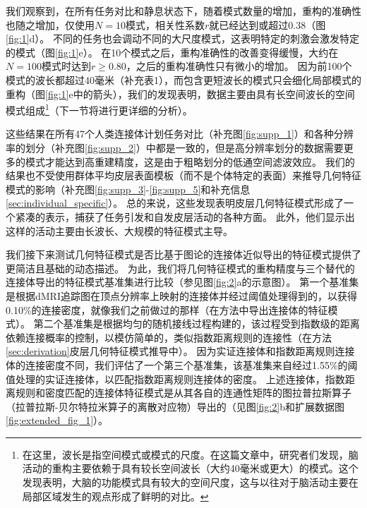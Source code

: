 \documentclass[lang=cn,a4paper,newtx]{elegantpaper}
\begin{document}
我们观察到，在所有任务对比和静息状态下，随着模式数量的增加，重构的准确性也随之增加，仅使用$ N=10 $模式，相关性系数$ r $就已经达到或超过0.38（图\ref{fig:1}d）。
不同的任务也会调动不同的大尺度模式，这表明特定的刺激会激发特定的模式（图\ref{fig:1}e）。
在10个模式之后，重构准确性的改善变得缓慢，大约在$ N=100 $模式时达到$ r \geq 0.80 $，之后的重构准确性只有微小的增加。
因为前100个模式的波长都超过40毫米（补充表1），而包含更短波长的模式只会细化局部模式的重构（图\ref{fig:1}e中的箭头），我们的发现表明，数据主要由具有长空间波长的空间模式组成\footnote{在这里，波长是指空间模式或模式的尺度。在这篇文章中，研究者们发现，脑活动的重构主要依赖于具有较长空间波长（大约40毫米或更大）的模式。这个发现表明，大脑的功能模式具有较大的空间尺度，这与以往对于脑活动主要在局部区域发生的观点形成了鲜明的对比。}（下一节将进行更详细的分析）。


这些结果在所有47个人类连接体计划任务对比（补充图\ref{fig:supp_1}）和各种分辨率的划分（补充图\ref{fig:supp_2}）中都是一致的，但是高分辨率划分的数据需要更多的模式才能达到高重建精度，这是由于粗略划分的低通空间滤波效应。
我们的结果也不受使用群体平均皮层表面模板（而不是个体特定的表面）来推导几何特征模式的影响（补充图\ref{fig:supp_3}-\ref{fig:supp_5}和补充信息\ref{sec:individual_specific}）。
总的来说，这些发现表明皮层几何特征模式形成了一个紧凑的表示，捕获了任务引发和自发皮层活动的各种方面。
此外，他们显示出这样的活动主要由长波长、大规模的特征模式主导。


我们接下来测试几何特征模式是否比基于图论的连接体近似导出的特征模式提供了更简洁且基础的动态描述。
为此，我们将几何特征模式的重构精度与三个替代的连接体导出的特征模式基准集进行比较（参见图\ref{fig:2}a的示意图）。
第一个基准集是根据dMRI追踪图在顶点分辨率上映射的连接体并经过阈值处理得到的，以获得0.10\%的连接密度，就像我们之前做过的那样（在方法中导出连接体的特征模式）。
第二个基准集是根据均匀的随机接线过程构建的，该过程受到指数级的距离依赖连接概率的控制，以模仿简单的，类似指数距离规则的连接性（在方法\ref{sec:derivation}皮层几何特征模式推导中）。
因为实证连接体和指数距离规则连接体的连接密度不同，我们评估了一个第三个基准集，该基准集来自经过1.55\%的阈值处理的实证连接体，以匹配指数距离规则连接体的密度。
上述连接体，指数距离规则和密度匹配的连接体特征模式是从其各自的连通性矩阵的图拉普拉斯算子（拉普拉斯-贝尔特拉米算子的离散对应物）导出的（见图\ref{fig:2}b和扩展数据图\ref{fig:extended_fig_1}）。
\end{document}
